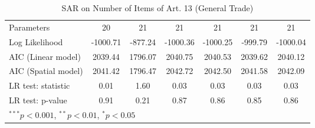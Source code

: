 \begin{table}[!h]
\begin{center}
\begin{tabular}{l c c c c c c }
Parameters              & 20           & 21           & 21           & 21           & 21           & 21           \\
Log Likelihood          & -1000.71     & -877.24      & -1000.36     & -1000.25     & -999.79      & -1000.04     \\
AIC (Linear model)      & 2039.44      & 1796.07      & 2040.75      & 2040.53      & 2039.62      & 2040.12      \\
AIC (Spatial model)     & 2041.42      & 1796.47      & 2042.72      & 2042.50      & 2041.58      & 2042.09      \\
LR test: statistic      & 0.01         & 1.60         & 0.03         & 0.03         & 0.03         & 0.03         \\
LR test: p-value        & 0.91         & 0.21         & 0.87         & 0.86         & 0.85         & 0.86         \\
\bottomrule
\multicolumn{7}{l}{\scriptsize{$^{***}p<0.001$, $^{**}p<0.01$, $^*p<0.05$}}
\end{tabular}
\caption{SAR on Number of Items of Art. 13 (General Trade)}
\label{table:coefficients}
\end{center}
\end{table}

